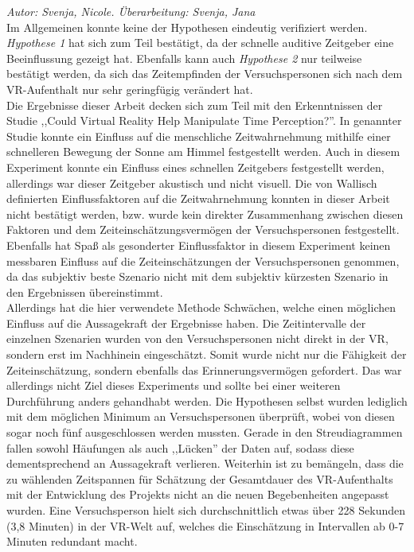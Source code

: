 \documentclass{Paper}
\begin{document}


 \textit{Autor: Svenja, Nicole. Überarbeitung: Svenja, Jana}\\
Im Allgemeinen konnte keine der Hypothesen eindeutig verifiziert werden. \textit{Hypothese 1} hat sich zum Teil bestätigt, da der schnelle auditive Zeitgeber eine Beeinflussung gezeigt hat. Ebenfalls kann auch \textit{Hypothese 2} nur teilweise bestätigt werden, da sich das Zeitempfinden der Versuchspersonen sich nach dem VR-Aufenthalt nur sehr geringfügig verändert hat.\\
Die Ergebnisse dieser Arbeit decken sich zum Teil mit den Erkenntnissen der Studie ,,Could Virtual Reality Help Manipulate Time Perception?''\cite{DeviceSystems2016}. In genannter Studie konnte ein Einfluss auf die menschliche Zeitwahrnehmung mithilfe einer schnelleren Bewegung der Sonne am Himmel festgestellt werden. Auch in diesem Experiment konnte ein Einfluss eines schnellen Zeitgebers festgestellt werden, allerdings war dieser Zeitgeber akustisch und nicht visuell.
Die von Wallisch definierten Einflussfaktoren auf die Zeitwahrnehmung\cite{Wallisch2003} konnten in dieser Arbeit nicht bestätigt werden, bzw. wurde kein direkter Zusammenhang zwischen diesen Faktoren und dem Zeiteinschätzungsvermögen der Versuchspersonen festgestellt. Ebenfalls hat Spaß als gesonderter Einflussfaktor\cite{Welt24} in diesem Experiment keinen messbaren Einfluss auf die Zeiteinschätzungen der Versuchspersonen genommen, da das subjektiv beste Szenario nicht mit dem subjektiv kürzesten Szenario in den Ergebnissen übereinstimmt.\\
Allerdings hat die hier verwendete Methode Schwächen, welche einen möglichen Einfluss auf die Aussagekraft der Ergebnisse haben.
Die Zeitintervalle der einzelnen Szenarien wurden von den Versuchspersonen nicht direkt in der VR, sondern erst im Nachhinein eingeschätzt. Somit wurde nicht nur die Fähigkeit der Zeiteinschätzung, sondern ebenfalls das Erinnerungsvermögen gefordert. Das war allerdings nicht Ziel dieses Experiments und sollte bei einer weiteren Durchführung anders gehandhabt werden.
Die Hypothesen selbst wurden lediglich mit dem möglichen Minimum an Versuchspersonen überprüft, wobei von diesen sogar noch fünf ausgeschlossen werden mussten. Gerade in den Streudiagrammen fallen sowohl Häufungen als auch ,,Lücken'' der Daten auf, sodass diese dementsprechend an Aussagekraft verlieren.
Weiterhin ist zu bemängeln, dass die zu wählenden Zeitspannen für Schätzung der Gesamtdauer des VR-Aufenthalts mit der Entwicklung des Projekts nicht an die neuen Begebenheiten angepasst wurden. Eine Versuchsperson hielt sich durchschnittlich etwas über 228 Sekunden (3,8 Minuten) in der VR-Welt auf, welches die Einschätzung in Intervallen ab 0-7 Minuten redundant macht.\\ 
\end{document}
